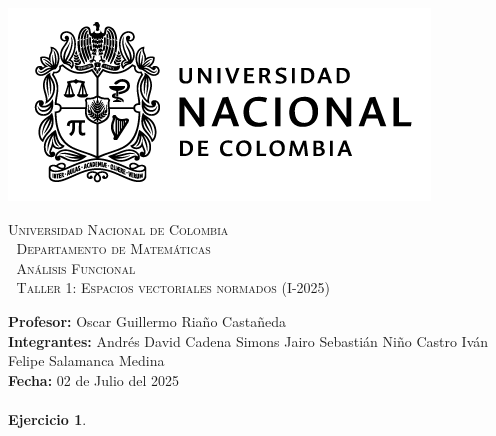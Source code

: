 \thispagestyle{empty}

\begin{minipage}{0.3\textwidth}
  \includegraphics[scale=0.35]{logounal.png}
\end{minipage}%
\hfill
\begin{minipage}{0.65\textwidth}
  \begin{center}
    \scshape
    \Large \textsc{Universidad Nacional de Colombia} \\
    \textcolor{white}{\tiny.} \Large \textsc{Departamento de Matemáticas} \\
    \textcolor{white}{\tiny.} \large \textsc{Análisis Funcional} \\
    \textcolor{white}{\tiny.} \large \textsf{Taller 1: Espacios vectoriales normados} \normalsize (I-2025)
  \end{center}
\end{minipage}

\vspace{0.3cm}
\normalfont

\textbf{Profesor:} Oscar Guillermo Riaño Castañeda\\
\textbf{Integrantes:} Andrés David Cadena Simons \hspace{2.8cm}  Jairo Sebastián Niño Castro\hspace{2.8cm}
Iván Felipe Salamanca Medina\\
\hspace*{2.1cm}\hspace{2.25cm}\textbf{Fecha:} 02 de Julio del 2025\\
\vspace{0.25cm}\\

\textbf{Ejercicio 1}.

